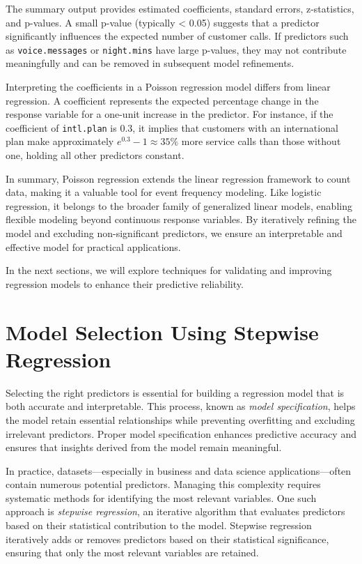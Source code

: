 \documentclass[
  11pt,
]{book}
\theoremstyle{definition}
\theoremstyle{definition}
\theoremstyle{definition}
\theoremstyle{definition}
\theoremstyle{remark}
\begin{document}
The summary output provides estimated coefficients, standard errors, z-statistics, and p-values. A small p-value (typically \textless{} 0.05) suggests that a predictor significantly influences the expected number of customer calls. If predictors such as \texttt{voice.messages} or \texttt{night.mins} have large p-values, they may not contribute meaningfully and can be removed in subsequent model refinements.

Interpreting the coefficients in a Poisson regression model differs from linear regression. A coefficient represents the expected percentage change in the response variable for a one-unit increase in the predictor. For instance, if the coefficient of \texttt{intl.plan} is 0.3, it implies that customers with an international plan make approximately \(e^{0.3} - 1 \approx 35\%\) more service calls than those without one, holding all other predictors constant.

In summary, Poisson regression extends the linear regression framework to count data, making it a valuable tool for event frequency modeling. Like logistic regression, it belongs to the broader family of generalized linear models, enabling flexible modeling beyond continuous response variables. By iteratively refining the model and excluding non-significant predictors, we ensure an interpretable and effective model for practical applications.

In the next sections, we will explore techniques for validating and improving regression models to enhance their predictive reliability.

\section{Model Selection Using Stepwise Regression}\label{sec-stepwise-regression}

Selecting the right predictors is essential for building a regression model that is both accurate and interpretable. This process, known as \emph{model specification}, helps the model retain essential relationships while preventing overfitting and excluding irrelevant predictors. Proper model specification enhances predictive accuracy and ensures that insights derived from the model remain meaningful.

In practice, datasets---especially in business and data science applications---often contain numerous potential predictors. Managing this complexity requires systematic methods for identifying the most relevant variables. One such approach is \emph{stepwise regression}, an iterative algorithm that evaluates predictors based on their statistical contribution to the model. Stepwise regression iteratively adds or removes predictors based on their statistical significance, ensuring that only the most relevant variables are retained.
\end{document}
